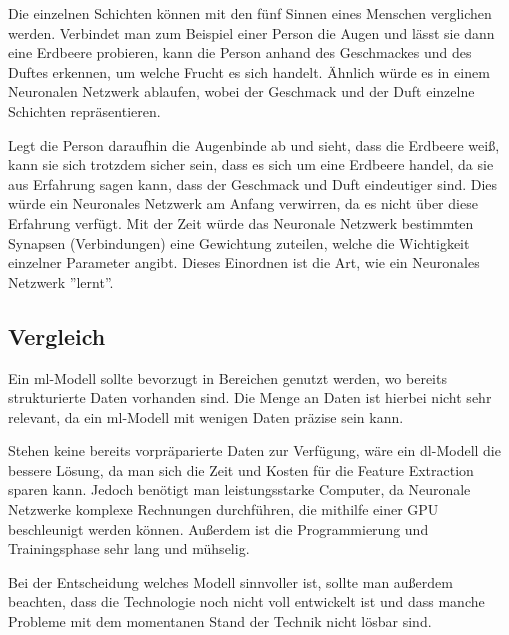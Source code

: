Die einzelnen Schichten können mit den fünf Sinnen eines Menschen verglichen werden. Verbindet man zum Beispiel einer Person die Augen und lässt sie dann eine Erdbeere probieren, kann die Person anhand des Geschmackes und des Duftes erkennen, um welche Frucht es sich handelt. Ähnlich würde es in einem Neuronalen Netzwerk ablaufen, wobei der Geschmack und der Duft einzelne Schichten repräsentieren.

Legt die Person daraufhin die Augenbinde ab und sieht, dass die Erdbeere weiß, kann sie sich trotzdem sicher sein, dass es sich um eine Erdbeere handel, da sie aus Erfahrung sagen kann, dass der Geschmack und Duft eindeutiger sind. Dies würde ein Neuronales Netzwerk am Anfang verwirren, da es nicht über diese Erfahrung verfügt. Mit der Zeit würde das Neuronale Netzwerk bestimmten Synapsen (Verbindungen) eine Gewichtung zuteilen, welche die Wichtigkeit einzelner Parameter angibt. Dieses Einordnen ist die Art, wie ein Neuronales Netzwerk ''lernt''.\cite{NN}

\subsection{Vergleich}

Ein \gls{ml}-Modell sollte bevorzugt in Bereichen genutzt werden, wo bereits strukturierte Daten vorhanden sind. Die Menge an Daten ist hierbei nicht sehr relevant, da ein \gls{ml}-Modell mit wenigen Daten präzise sein kann. 

Stehen keine bereits vorpräparierte Daten zur Verfügung, wäre ein \gls{dl}-Modell die bessere Lösung, da man sich die Zeit und Kosten für die Feature Extraction sparen kann. Jedoch benötigt man leistungsstarke Computer, da Neuronale Netzwerke komplexe Rechnungen durchführen, die mithilfe einer GPU beschleunigt werden können. Außerdem ist die Programmierung und Trainingsphase sehr lang und mühselig. \cite{MLvsDL}

Bei der Entscheidung welches Modell sinnvoller ist, sollte man außerdem beachten, dass die Technologie noch nicht voll entwickelt ist und dass manche Probleme mit dem momentanen Stand der Technik nicht lösbar sind.